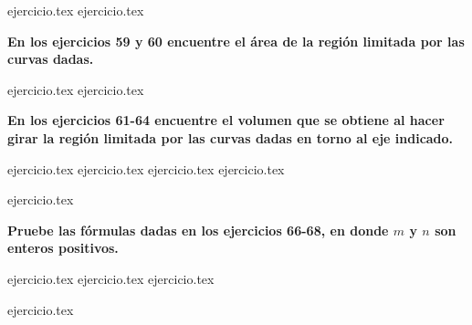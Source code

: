 \vspace{0.5cm}
\begin{enumerate}
    \setcounter{enumi}{56}
    {ejercicio.tex}
{ejercicio.tex}
\end{enumerate}

\vspace{0.5cm}
\noindent\textbf{En los ejercicios 59 y 60 encuentre el área de la región limitada por las curvas dadas.}
\begin{enumerate}
    \setcounter{enumi}{58}
    {ejercicio.tex}
{ejercicio.tex}
\end{enumerate}

\vspace{0.5cm}
\noindent\textbf{En los ejercicios 61-64 encuentre el volumen que se obtiene al hacer girar la región limitada por las curvas dadas en torno al eje indicado.}
\begin{enumerate}
    \setcounter{enumi}{60}
    {ejercicio.tex}
{ejercicio.tex}
{ejercicio.tex}
{ejercicio.tex}
\end{enumerate}

\vspace{0.5cm}
\begin{enumerate}
    \setcounter{enumi}{64}
    {ejercicio.tex}
\end{enumerate}

\vspace{0.5cm}
\noindent\textbf{Pruebe las fórmulas dadas en los ejercicios 66-68, en donde $m$ y $n$ son enteros positivos.}
\begin{enumerate}
    \setcounter{enumi}{65}
    {ejercicio.tex}
{ejercicio.tex}
{ejercicio.tex}
\end{enumerate}

\vspace{0.5cm}
\begin{enumerate}
    \setcounter{enumi}{68}
    {ejercicio.tex}
\end{enumerate}
